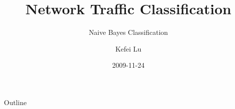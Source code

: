 \documentclass{beamer}
\title[Network Traffic Classification] %
{Network Traffic Classification}
\subtitle
{Naive Bayes Classification}
\author %
{Kefei Lu}
\institute[Universities of Miami] %
{
  Department of Electrical and Computer Engineering\\
  University of Miami}
\date[] %
{2009-11-24}
\begin{document}
\begin{frame}
  \titlepage
\end{frame}

\begin{frame}{Outline}
  \tableofcontents
\end{frame}
\end{document}
